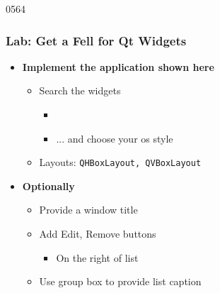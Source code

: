 \begin{slide}{0564}\frametitle{Lab: Get a Fell for Qt Widgets}
  \label{first_app}
  \begin{itemize}
  \item \textbf{Implement the application shown here}
    \begin{itemize}
   \item Search the widgets
      \begin{itemize}    
      \item {}
      \item ... and choose your os style
      \end{itemize}
    \item Layouts: \texttt{QHBoxLayout, QVBoxLayout}
    \end{itemize}
  \item \textbf{Optionally}
    \begin{itemize} 
    \item Provide a window title
    \item Add Edit, Remove buttons
      \begin{itemize}
      \item  On the right of list
      \end{itemize}
    \item Use group box to provide list caption
    \end{itemize}
 \end{itemize}
  \medskip
   \newline
\end{slide}
